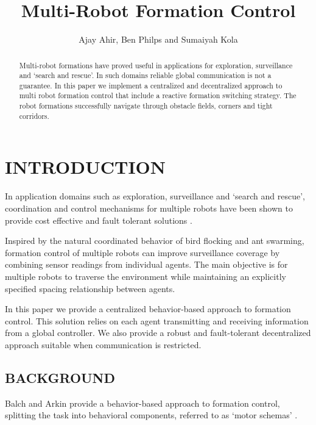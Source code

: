 \documentclass[letterpaper, 10 pt, conference]{ieeeconf}  %
\title{\LARGE \bf Multi-Robot Formation Control}
\author{Ajay Ahir, Ben Philps and Sumaiyah Kola}
\begin{document}
	
	\maketitle
	\thispagestyle{empty}
	\pagestyle{empty}
	
	\begin{abstract}
		
		Multi-robot formations have proved useful in applications for exploration, surveillance and `search and rescue'. In such domains reliable global communication is not a guarantee. In this paper we implement a centralized and decentralized approach to multi robot formation control that include a reactive formation switching strategy. The robot formations successfully navigate through obstacle fields, corners and tight corridors.
		
	\end{abstract}
	
	\section{INTRODUCTION}
	
	In application domains such as exploration, surveillance and `search and rescue', coordination and control mechanisms for multiple robots have been shown to provide cost effective and fault tolerant solutions \cite{c1}.
	
	Inspired by the natural coordinated behavior of bird flocking and ant swarming, formation control of multiple robots can improve surveillance coverage by combining sensor readings from individual agents. The main objective is for multiple robots to traverse the environment while maintaining an explicitly specified spacing relationship between agents.
	
	In this paper we provide a centralized behavior-based approach to formation control. This solution relies on each agent transmitting and receiving information from a global controller. We also provide a robust and fault-tolerant decentralized approach suitable when communication is restricted.
	
	\subsection{BACKGROUND}
	
	Balch and Arkin provide a behavior-based approach to formation control, splitting the task into behavioral components, referred to as `motor schemas' \cite{c2}. 
	
\end{document}
